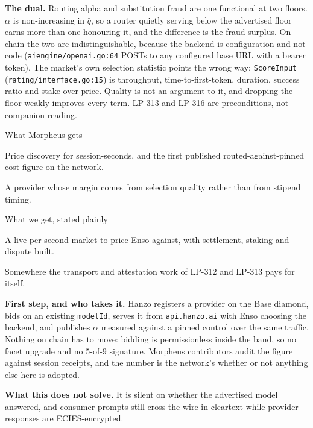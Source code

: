 \documentclass[10pt,a4paper]{article}
\newcommand{\code}[1]{\texttt{\small #1}}
\begin{document}
\vspace{0.35ex}
\noindent\textbf{The dual.}
Routing alpha and substitution fraud are one functional at two floors. $\alpha$ is non-increasing
in $\bar q$, so a router quietly serving below the advertised floor earns more than one honouring
it, and the difference is the fraud surplus. On chain the two are indistinguishable, because the
backend is configuration and not code (\code{aiengine/openai.go:64} POSTs to any configured base
URL with a bearer token). The market's own selection statistic points the wrong way:
\code{ScoreInput} (\code{rating/interface.go:15}) is throughput, time-to-first-token, duration,
success ratio and stake over price. Quality is not an argument to it, and dropping the floor
weakly improves every term. LP-313 and LP-316 are preconditions, not companion reading.

\begin{stake}{What Morpheus gets}
\item Price discovery for session-seconds, and the first published routed-against-pinned cost
      figure on the network.
\item A provider whose margin comes from selection quality rather than from stipend timing.
\end{stake}

\begin{stake}{What we get, stated plainly}
\item A live per-second market to price Enso against, with settlement, staking and dispute built.
\item Somewhere the transport and attestation work of LP-312 and LP-313 pays for itself.
\end{stake}

\noindent\textbf{First step, and who takes it.}
Hanzo registers a provider on the Base diamond, bids on an existing \code{modelId}, serves it from
\code{api.hanzo.ai} with Enso choosing the backend, and publishes $\alpha$ measured against a
pinned control over the same traffic. Nothing on chain has to move: bidding is permissionless
inside the band, so no facet upgrade and no 5-of-9 signature. Morpheus contributors audit the
figure against session receipts, and the number is the network's whether or not anything else
here is adopted.

\vspace{0.35ex}
\noindent\textbf{What this does not solve.}
It is silent on whether the advertised model answered, and consumer prompts still cross the wire
in cleartext while provider responses are ECIES-encrypted.

\vspace{0.5ex}
\end{document}
